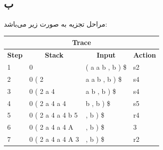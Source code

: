 \documentclass{article}
\begin{document}
\subsection{ب}
مراحل تجزیه به صورت زیر می‌باشد:
\begin{latin}
\begin{table}[H]
\begin{tabular}{|llll|}
\hline
\multicolumn{4}{|c|}{\textbf{Trace}}                                                                                                                                                    \\ \hline
\multicolumn{1}{|c|}{\textbf{Step}} & \multicolumn{1}{c|}{\textbf{Stack}}                                & \multicolumn{1}{c|}{\textbf{Input}}   & \multicolumn{1}{c|}{\textbf{Action}} \\ \hline
\multicolumn{1}{|l|}{1}             & \multicolumn{1}{l|}{{\color[HTML]{0000FF} 0}}                      & \multicolumn{1}{l|}{( a a b , b ) \$} & s2                                   \\ \hline
\multicolumn{1}{|l|}{2}             & \multicolumn{1}{l|}{{\color[HTML]{0000FF} 0 ( 2}}                  & \multicolumn{1}{l|}{a a b , b ) \$}   & s4                                   \\ \hline
\multicolumn{1}{|l|}{3}             & \multicolumn{1}{l|}{{\color[HTML]{0000FF} 0 ( 2 a 4}}              & \multicolumn{1}{l|}{a b , b ) \$}     & s4                                   \\ \hline
\multicolumn{1}{|l|}{4}             & \multicolumn{1}{l|}{{\color[HTML]{0000FF} 0 ( 2 a 4 a 4}}          & \multicolumn{1}{l|}{b , b ) \$}       & s5                                   \\ \hline
\multicolumn{1}{|l|}{5}             & \multicolumn{1}{l|}{{\color[HTML]{0000FF} 0 ( 2 a 4 a 4 b 5}}      & \multicolumn{1}{l|}{, b ) \$}         & r4                                   \\ \hline
\multicolumn{1}{|l|}{6}             & \multicolumn{1}{l|}{{\color[HTML]{0000FF} 0 ( 2 a 4 a 4 A}}        & \multicolumn{1}{l|}{, b ) \$}         & {\color[HTML]{0000FF} 3}             \\ \hline
\multicolumn{1}{|l|}{7}             & \multicolumn{1}{l|}{{\color[HTML]{0000FF} 0 ( 2 a 4 a 4 A 3}}      & \multicolumn{1}{l|}{, b ) \$}         & r2                                   \\ \hline

\end{tabular}
\end{table}
\end{latin}
\end{document}

